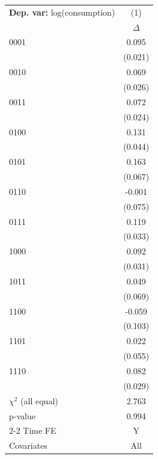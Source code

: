 \begin{tabular}{l c} \toprule  \textbf{Dep. var:}  log(consumption) 
                    &\multicolumn{1}{c}{(1)}         \\
                    &    $\Delta$         \\
0001                &       0.095\sym{***}\\
                    &     (0.021)         \\
0010                &       0.069\sym{***}\\
                    &     (0.026)         \\
0011                &       0.072\sym{***}\\
                    &     (0.024)         \\
0100                &       0.131\sym{***}\\
                    &     (0.044)         \\
0101                &       0.163\sym{**} \\
                    &     (0.067)         \\
0110                &      -0.001         \\
                    &     (0.075)         \\
0111                &       0.119\sym{***}\\
                    &     (0.033)         \\
1000                &       0.092\sym{***}\\
                    &     (0.031)         \\
1011                &       0.049         \\
                    &     (0.069)         \\
1100                &      -0.059         \\
                    &     (0.103)         \\
1101                &       0.022         \\
                    &     (0.055)         \\
1110                &       0.082\sym{***}\\
                    &     (0.029)         \\
\addlinespace
$\chi^2$ (all equal)&       2.763         \\
p-value             &       0.994         \\
\cmidrule{2-2} Time FE & Y \\ Covariates & All \\ \bottomrule \end{tabular}
